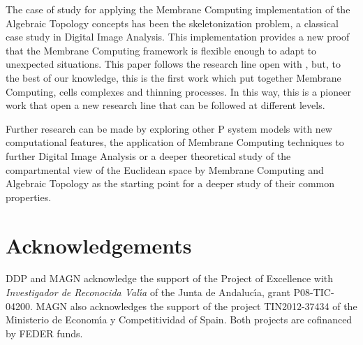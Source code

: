 \documentclass[journal]{IEEEtran}
\begin{document}
The case of study for applying the Membrane Computing implementation of the
Algebraic Topology concepts has been the skeletonization problem, a classical
case study in Digital Image Analysis. This implementation provides a new proof
that the Membrane Computing framework is flexible enough to adapt to unexpected
situations. This paper follows the research line open with
\cite{ChristinalDR10}, but, to the best of our knowledge, this is the first work
which put together Membrane Computing, cells complexes and thinning processes.
In this way, this is a pioneer work that open a new research line that can be
followed at different levels.

Further research can be made by exploring other P system models with new
computational features, the application of Membrane Computing techniques to
further Digital Image Analysis or a deeper theoretical study of the
compartmental view of the Euclidean space by Membrane Computing and Algebraic
Topology as the starting point for a deeper study of their common properties.

\section*{Acknowledgements}
DDP and MAGN acknowledge the support of the Project of Excellence with
{\it Investigador de Reconocida Val\'{\i}a} of the Junta de
Andaluc\'{\i}a, grant P08-TIC-04200. MAGN also acknowledges the
support of the project TIN2012-37434 of the Ministerio de
Econom\'{\i}a y Competitividad of Spain. Both projects are cofinanced
by FEDER funds.



\end{document}
